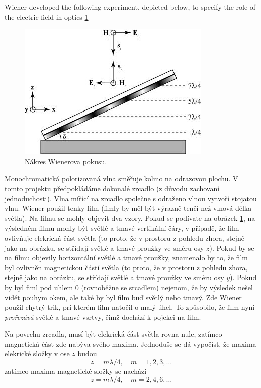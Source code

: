 \documentclass[12pt,a4paper,titlepage,final]{report}
\begin{document}
Wiener developed the following experiment, depicted below, to specify the role of the electric field in optics \ref{fig:energy_fig_wiener}

\begin{figure}[!htb]
   \centering
 	\includegraphics{energy_fig_wiener}
   \caption{Nákres Wienerova pokusu.}
   \label{fig:energy_fig_wiener}
\end{figure}

Monochromatická polorizovaná vlna směřuje kolmo na odrazovou plochu. V tomto
projektu předpokládáme dokonalé zrcadlo (z důvodu zachovaní jednoduchosti). Vlna mířící na zrcadlo společne s odraženo vlnou
vytvoří stojatou vlnu. Wiener použil tenky film (fimly by měl být výrazně tenčí než vlnová délka světla). 
Na filmu se mohly objevit dva vzory. Pokud se podívate na obrázek \ref{fig:energy_fig_wiener}, na výsledném filmu mohly být světlé a tmavé vertikální čáry, v případě, že film ovlivňuje elekrická část světla (to proto, že v prostoru z pohledu zhora, stejně jako na obrázku, se střídají světlé a tmavé proužky ve směru osy $z$). Pokud by se na filmu objevily 
horizontální světlé a tmavé proužky, znamenalo by to, že film byl ovlivněn magnetickou částí světla (to proto, že v prostoru z pohledu zhora, stejně jako na obrázku, se střídají světlé a tmavé proužky ve směru osy $y$). Pokud by byl fiml pod uhlem 0 (rovnoběžne se srcadlem) nejenom, že by výsledek nešel vidět pouhym okem, ale také by byl film buď světlý nebo tmavý. Zde Wiener použil chytrý trik, pri kterém film natočil o malý úhel. To způsobilo, že film nyní \emph{prořezává} světlé a tmavé vsrtvy, čimž dochází k pojekci 
na film.

Na povrchu zrcadla, musí být elekrická část světla rovna nule, zatímco magnetická část zde nabýva svého maxima. Jednoduše se dá 
vypočíst, že maxima elekrické složky v ose $z$ budou
\begin{equation}
z = m\lambda / 4, \quad m=1,2,3,\ldots
\end{equation}
zatímco maxima magnetické složky se nachází
\begin{equation}
z = m\lambda / 4, \quad m=2,4,6,\ldots
\end{equation}
\end{document}
